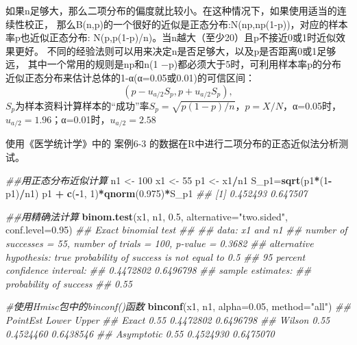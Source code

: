 \documentclass[
]{article}
\newenvironment{Shaded}{\begin{snugshade}}{\end{snugshade}}
\newcommand{\CommentTok}[1]{\textcolor[rgb]{0.56,0.35,0.01}{\textit{#1}}}
\newcommand{\DataTypeTok}[1]{\textcolor[rgb]{0.13,0.29,0.53}{#1}}
\newcommand{\DecValTok}[1]{\textcolor[rgb]{0.00,0.00,0.81}{#1}}
\newcommand{\FloatTok}[1]{\textcolor[rgb]{0.00,0.00,0.81}{#1}}
\newcommand{\KeywordTok}[1]{\textcolor[rgb]{0.13,0.29,0.53}{\textbf{#1}}}
\newcommand{\NormalTok}[1]{#1}
\newcommand{\OperatorTok}[1]{\textcolor[rgb]{0.81,0.36,0.00}{\textbf{#1}}}
\newcommand{\StringTok}[1]{\textcolor[rgb]{0.31,0.60,0.02}{#1}}
\begin{document}
如果n足够大，那么二项分布的偏度就比较小。在这种情况下，如果使用适当的连续性校正，
那么B(n,p)的一个很好的近似是正态分布:N(np,np(1-p))，对应的样本率p也近似正态分布:
N(p,p(1-p)/n)。当n越大（至少20）且p不接近0或1时近似效果更好。
不同的经验法则可以用来决定n是否足够大，以及p是否距离0或1足够远，
其中一个常用的规则是np和n(1 −p)都必须大于5时，可利用样本率p的分布近似正态分布来估计总体的1-α(α=0.05或0.01)的可信区间：
\[(p-u_{a/2}S_p,p+u_{a/2}S_p) ,\]
\(S_p\)为样本资料计算样本的``成功''率\(S_p=\sqrt{{p(1-p)}/{n}}，p=X/N\)，α=0.05时，\(u_{a/2}=1.96\)；α=0.01时，\(u_{a/2}=2.58\)

使用《医学统计学》中的 案例6-3 的数据在R中进行二项分布的正态近似法分析测试。

\begin{Shaded}
\begin{Highlighting}[]
\CommentTok{##用正态分布近似计算}
\NormalTok{n1 <-}\StringTok{ }\DecValTok{100}
\NormalTok{x1 <-}\StringTok{ }\DecValTok{55}
\NormalTok{p1 <-}\StringTok{ }\NormalTok{x1}\OperatorTok{/}\NormalTok{n1}
\NormalTok{S_p1=}\KeywordTok{sqrt}\NormalTok{(p1}\OperatorTok{*}\NormalTok{(}\DecValTok{1}\OperatorTok{-}\NormalTok{p1)}\OperatorTok{/}\NormalTok{n1)}
\NormalTok{p1 }\OperatorTok{+}\StringTok{ }\KeywordTok{c}\NormalTok{(}\OperatorTok{-}\DecValTok{1}\NormalTok{, }\DecValTok{1}\NormalTok{)}\OperatorTok{*}\KeywordTok{qnorm}\NormalTok{(}\FloatTok{0.975}\NormalTok{)}\OperatorTok{*}\NormalTok{S_p1}
\CommentTok{## [1] 0.452493 0.647507}

\CommentTok{##用精确法计算}
\KeywordTok{binom.test}\NormalTok{(x1, n1, }\FloatTok{0.5}\NormalTok{, }\DataTypeTok{alternative=}\StringTok{"two.sided"}\NormalTok{, }\DataTypeTok{conf.level=}\FloatTok{0.95}\NormalTok{)}
\CommentTok{##  Exact binomial test}
\CommentTok{## }
\CommentTok{## data:  x1 and n1}
\CommentTok{## number of successes = 55, number of trials = 100, p-value = 0.3682}
\CommentTok{## alternative hypothesis: true probability of success is not equal to 0.5}
\CommentTok{## 95 percent confidence interval:}
\CommentTok{##  0.4472802 0.6496798}
\CommentTok{## sample estimates:}
\CommentTok{## probability of success }
\CommentTok{##                   0.55 }

\CommentTok{#使用Hmisc包中的binconf()函数}
\KeywordTok{binconf}\NormalTok{(x1, n1, }\DataTypeTok{alpha=}\FloatTok{0.05}\NormalTok{, }\DataTypeTok{method=}\StringTok{"all"}\NormalTok{)}
\CommentTok{##            PointEst     Lower     Upper}
\CommentTok{## Exact          0.55 0.4472802 0.6496798}
\CommentTok{## Wilson         0.55 0.4524460 0.6438546}
\CommentTok{## Asymptotic     0.55 0.4524930 0.6475070}
\end{Highlighting}
\end{Shaded}
\end{document}
